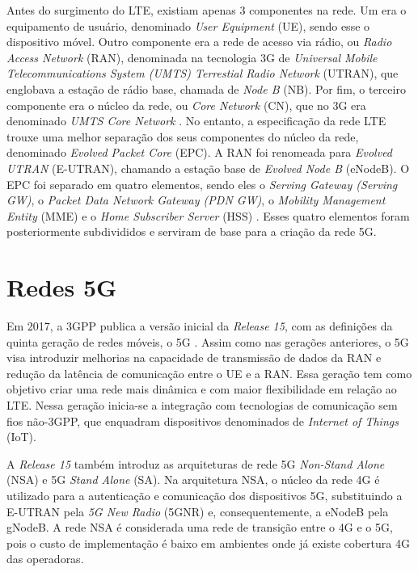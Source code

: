 Antes do surgimento do LTE, existiam apenas 3 componentes na rede. Um era o equipamento de usuário, denominado \textit{User Equipment} (UE), sendo esse o dispositivo móvel. Outro componente era a rede de acesso via rádio, ou \textit{Radio Access Network} (RAN), denominada na tecnologia 3G de \textit{Universal Mobile Telecommunications System (UMTS) Terrestial Radio Network} (UTRAN), que englobava a estação de rádio base, chamada de \textit{Node B} (NB). Por fim, o terceiro componente era o núcleo da rede, ou \textit{Core Network} (CN), que no 3G era denominado \textit{UMTS Core Network} \cite{Miah2002}.
No entanto, a especificação da rede LTE trouxe uma melhor separação dos seus componentes do núcleo da rede, denominado \textit{Evolved Packet Core} (EPC).
A RAN foi renomeada para \textit{Evolved UTRAN} (E-UTRAN), chamando a estação base de \textit{Evolved Node B} (eNodeB).
O EPC foi separado em quatro elementos, sendo eles o \textit{Serving Gateway (Serving GW)}, o \textit{Packet Data Network Gateway (PDN GW)}, o \textit{Mobility Management Entity} (MME) e o \textit{Home Subscriber Server} (HSS) \cite{3gpp.23.214}.
Esses quatro elementos foram posteriormente subdivididos e serviram de base para a criação da rede 5G.

\section{Redes 5G}

Em 2017, a 3GPP publica a versão inicial da \textit{Release 15}, com as definições da quinta geração de redes móveis, o 5G \cite{3gpp.21.205}.
Assim como nas gerações anteriores, o 5G visa introduzir melhorias na capacidade de transmissão de dados da RAN e redução da latência de comunicação entre o UE e a RAN.
Essa geração tem como objetivo criar uma rede mais dinâmica e com maior flexibilidade em relação ao LTE.
Nessa geração inicia-se a integração com tecnologias de comunicação sem fios não-3GPP, que enquadram dispositivos denominados de \textit{Internet of Things} (IoT).

A \textit{Release 15} também introduz as arquiteturas de rede 5G \textit{Non-Stand Alone} (NSA) e 5G \textit{Stand Alone} (SA).
Na arquitetura NSA, o núcleo da rede 4G é utilizado para a autenticação e comunicação dos dispositivos 5G, substituindo a E-UTRAN pela \textit{5G New Radio} (5GNR) e, consequentemente, a eNodeB pela gNodeB.
A rede NSA é considerada uma rede de transição entre o 4G e o 5G, pois o custo de implementação é baixo em ambientes onde já existe cobertura 4G das operadoras.

